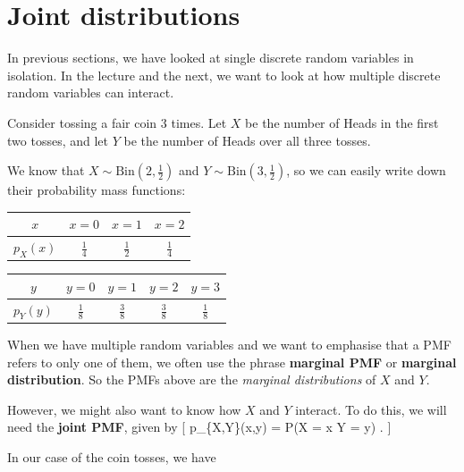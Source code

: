 \documentclass[
  letterpaper,
]{report}
\theoremstyle{definition}
\theoremstyle{definition}
\theoremstyle{remark}
\begin{document}
\hypertarget{joint}{%
\section{Joint distributions}\label{joint}}

In previous sections, we have looked at single discrete random variables
in isolation. In the lecture and the next, we want to look at how
multiple discrete random variables can interact.

Consider tossing a fair coin 3 times. Let \(X\) be the number of Heads
in the first two tosses, and let \(Y\) be the number of Heads over all
three tosses.

We know that \(X \sim \text{Bin}(2, \frac12)\) and
\(Y \sim \text{Bin}(3, \frac12)\), so we can easily write down their
probability mass functions:

\begin{longtable}[]{@{}cccc@{}}
\toprule()
\(x\) & \(x = 0\) & \(x = 1\) & \(x = 2\) \\
\midrule()
\endhead
\(p_X(x)\) & \(\frac14\) & \(\frac12\) & \(\frac14\) \\
\bottomrule()
\end{longtable}

\begin{longtable}[]{@{}ccccc@{}}
\toprule()
\(y\) & \(y = 0\) & \(y = 1\) & \(y = 2\) & \(y = 3\) \\
\midrule()
\endhead
\(p_Y(y)\) & \(\frac18\) & \(\frac38\) & \(\frac38\) & \(\frac18\) \\
\bottomrule()
\end{longtable}

When we have multiple random variables and we want to emphasise that a
PMF refers to only one of them, we often use the phrase \textbf{marginal
PMF} or \textbf{marginal distribution}. So the PMFs above are the
\emph{marginal distributions} of \(X\) and \(Y\).

However, we might also want to know how \(X\) and \(Y\) interact. To do
this, we will need the \textbf{joint PMF}, given by {[} p\_\{X,Y\}(x,y)
= \mathbb P(X = x  Y = y) . {]}

In our case of the coin tosses, we have
\end{document}

